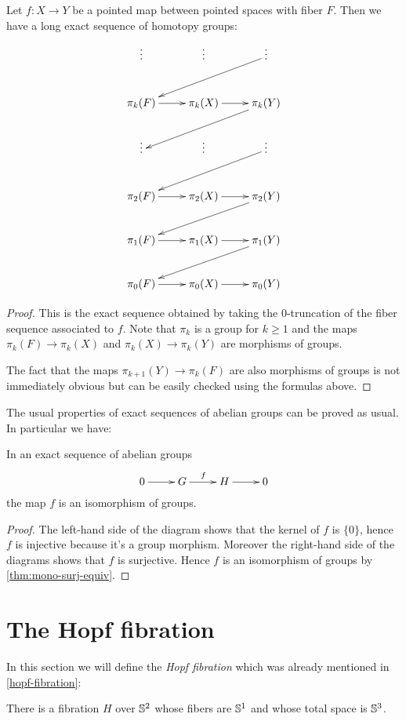 \begin{thm}
  Let $f:X\to{}Y$ be a pointed map between pointed spaces with fiber $F$. Then
  we have a long exact sequence of homotopy groups:
  \[
  \xymatrix{
    \vdots & \vdots & \vdots \ar[lld] \\
    \pi_k(F) \ar[r] & \pi_k(X) \ar[r] & \pi_k(Y) \ar[lld] \\
    \vdots & \vdots & \vdots \ar[lld] \\
    \pi_2(F) \ar[r] & \pi_2(X) \ar[r] & \pi_2(Y) \ar[lld] \\
    \pi_1(F) \ar[r] & \pi_1(X) \ar[r] & \pi_1(Y) \ar[lld]\\
    \pi_0(F) \ar[r] & \pi_0(X) \ar[r] & \pi_0(Y)}
  \]
\end{thm}
\begin{proof}
  This is the exact sequence obtained by taking the $0$-truncation of the fiber
  sequence associated to $f$. Note that $\pi_k$ is a group for $k\ge1$ and the
  maps $\pi_k(F)\to\pi_k(X)$ and $\pi_k(X)\to\pi_k(Y)$ are morphisms of groups.

  The fact that the maps $\pi_{k+1}(Y)\to\pi_k(F)$ are also morphisms of groups
  is not immediately obvious but can be easily checked using the formulas above.
\end{proof}

The usual properties of exact sequences of abelian groups can be proved as
usual. In particular we have:
\begin{lem}
  In an exact sequence of abelian groups
  \[\xymatrix{0 \ar[r]& G \ar^f[r] & H \ar[r] & 0}\]
  the map $f$ is an isomorphism of groups.
\end{lem}
\begin{proof}
  The left-hand side of the diagram shows that the kernel of $f$ is $\{0\}$,
  hence $f$ is injective because it’s a group morphism. Moreover the right-hand
  side of the diagrams shows that $f$ is surjective. Hence $f$ is an isomorphism
  of groups by \autoref{thm:mono-surj-equiv}.
\end{proof}

\section{The Hopf fibration}
\label{sec:hopf}

In this section we will define the \emph{Hopf fibration} which was already
mentioned in \autoref{hopf-fibration}:

\begin{thm}
There is a fibration $H$ over $\mathbb{S} ^2$ whose fibers are $\mathbb{S} ^1$ and
whose total space is $\mathbb{S} ^3$.
\end{thm}

